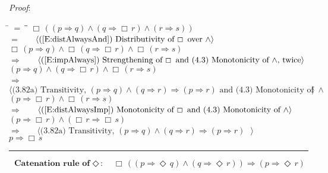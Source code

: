 \documentclass[12pt, fleqn, leqno]{article}
\newcommand{\lgap}{2pt}                             %
\newcommand{\mymathindent}{24pt}                    %
\newcommand{\impl}{\ensuremath{\Rightarrow}}        %
\newcommand{\Event}{\Diamond\,}
\newcommand{\Always}{\Box\,}
\newcommand{\myqed}{\rule[-.23ex]{1.2ex}{2.0ex}}
\newcommand{\myqedtab}{\hspace{384pt}}              %
\newcommand{\Gll} {\langle}                         %
\newcommand{\Ggg} {\rangle}                         %
\newcommand{\Hint}[1]     {\ \ \ $\Gll              \mbox{#1} \Ggg$ }   %
\begin{document}
\emph{Proof}:
\begin{tabbing}
\hspace{\mymathindent} \= $= \;$ \= \myqedtab \= \kill
  \> \>   $\Always ( (p \impl q) \land (q \impl \Always r) \land (r \impl s))$\\[\lgap]
   \> $=$  \>  \Hint{(\ref{E:distAlwaysAnd}) Distributivity of $\Always$ over $\land$}\\[\lgap]
  \> \>   $\Always ( p \impl q) \land \Always (q \impl \Always r) \land \Always (r \impl s)$\\[\lgap]
   \> $\impl$  \>  \Hint{(\ref{E:impAlways}) Strengthening of $\Always$ and (4.3) Monotonicity of $\land$, twice}\\[\lgap]
    \> \>   $ (p \impl q) \land (q \impl \Always r) \land \Always (r \impl s)$\\[\lgap]
    \> $\impl$  \>  \Hint{(3.82a) Transitivity, $(p\impl q) \land (q\impl r) \impl (p\impl r)$ and (4.3) Monotonicity of $\land$}\\[\lgap]
     \> \>   $ (p \impl \Always r) \land \Always (r \impl s)$\\[\lgap]
     \> $\impl$ \> \Hint{(\ref{E:distAlwaysImp}) Monotonicity of $\Always$ and (4.3) Monotonicity of $\land$} \\[\lgap]
  \> \>   $ (p \impl \Always r) \land (\Always r \impl \Always s)$\\[\lgap]
  \> $\impl$  \>  \Hint{(3.82a) Transitivity, $(p\impl q) \land (q\impl r) \impl (p\impl r)$ }\\[\lgap]
  \> \>   $ p \impl \Always s$\quad \myqed
\end{tabbing}
\begin{equation}\label{E:EventCatRule}
\textbf{Catenation rule of $\Event$:}\quad \Always ( (p \impl \Event q) \land (q \impl \Event r)) \impl (p \impl \Event r)
\end{equation}
\end{document}

